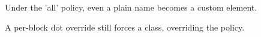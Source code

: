 \begin{note}
Under the 'all' policy, even a plain name becomes a custom element.
\end{note}

\begin{panel}
A per-block dot override still forces a class, overriding the policy.
\end{panel}


